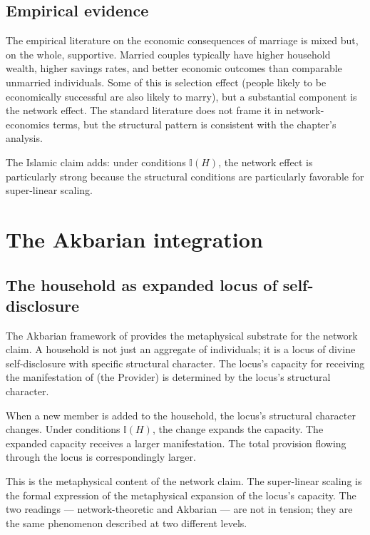 \subsection{Empirical evidence}

The empirical literature on the economic consequences of marriage
is mixed but, on the whole, supportive. Married couples typically
have higher household wealth, higher savings rates, and better
economic outcomes than comparable unmarried individuals. Some of
this is selection effect (people likely to be economically
successful are also likely to marry), but a substantial component
is the network effect. The standard literature does not frame it in
network-economics terms, but the structural pattern is consistent
with the chapter's analysis.

The Islamic claim adds: under conditions $\mathbb{I}(H)$, the
network effect is particularly strong because the structural
conditions are particularly favorable for super-linear scaling.

\section{The Akbarian integration}
\label{sec:network-akbarian}

\subsection{The household as expanded locus of self-disclosure}

The Akbarian framework of  provides the
metaphysical substrate for the network claim. A household is not
just an aggregate of individuals; it is a locus of divine
self-disclosure with specific structural character. The locus's
capacity for receiving the manifestation of  (the
Provider) is determined by the locus's structural character.

When a new member is added to the household, the locus's
structural character changes. Under conditions $\mathbb{I}(H)$, the
change expands the capacity. The expanded capacity receives a
larger manifestation. The total provision flowing through the
locus is correspondingly larger.

This is the metaphysical content of the network claim. The
super-linear scaling is the formal expression of the metaphysical
expansion of the locus's capacity. The two readings ---
network-theoretic and Akbarian --- are not in tension; they are
the same phenomenon described at two different levels.

